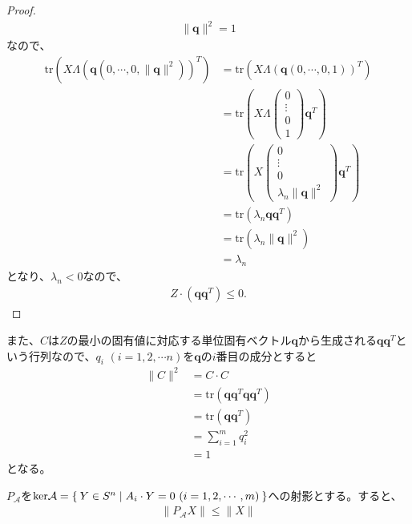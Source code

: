 \begin{proof}
\begin{align*}
    \|\mathbf{q}\|^2 = 1
  \end{align*}
  なので、
  \begin{align*}
        \mathrm{tr}\left(X \Lambda \left(\mathbf{q} \left(0, \cdots, 0, \|\mathbf{q}\|^2\right)\right)^T\right)
    & = \mathrm{tr}\left(X \Lambda \left(\mathbf{q} \left(0, \cdots, 0, 1\right)\right)^T\right) \\
    & = \mathrm{tr}\left(X \Lambda \left(\begin{array}{c} 0 \\ \vdots \\ 0 \\ 1 \end{array}\right) \mathbf{q}^T\right) \\
    & = \mathrm{tr}\left(X \left(\begin{array}{c} 0 \\ \vdots \\ 0 \\ \lambda_n \|\mathbf{q}\|^2 \end{array}\right) \mathbf{q}^T\right) \\
    & = \mathrm{tr}\left(\lambda_n \mathbf{q} \mathbf{q}^T\right) \\
    & = \mathrm{tr}\left(\lambda_n \|\mathbf{q}\|^2\right) \\
    & = \lambda_n
  \end{align*}
  となり、$\lambda_n < 0$なので、
  \begin{align*}
    Z \cdot \left(\mathbf{q} \mathbf{q}^T\right) \leq 0.
  \end{align*}
\end{proof}
また、$C$は$Z$の最小の固有値に対応する単位固有ベクトル$\mathbf{q}$から生成される$\mathbf{q} \mathbf{q}^T$という行列なので、$q_i \,\, (i = 1, 2, \cdots n)$を$\mathbf{q}$の$i$番目の成分とすると
\begin{align*}
  \|C\|^2 & = C \cdot C \\
          & = \mathrm{tr} \left(\mathbf{q} \mathbf{q}^T \mathbf{q} \mathbf{q}^T\right) \\
          & = \mathrm{tr} \left(\mathbf{q} \mathbf{q}^T\right) \\
          & = \displaystyle{\sum_{i = 1}^m q_i^2} \\
          & = 1
\end{align*}
となる。
\begin{lemma} \label{Shrink}
  $P_\mathcal{A}$を$\mathrm{ker} \mathcal{A} = \Set{Y \in S^n | A_i \cdot Y = 0 \,\, (i = 1, 2, \cdots, m)}$への射影とする。すると、
  \begin{align*}
    \|P_\mathcal{A} X\| \leq \|X\|
  \end{align*}
\end{lemma}
